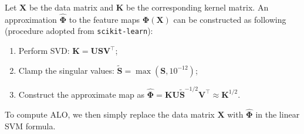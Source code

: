 \documentclass[11pt]{article}
\newcommand{\bK}{\bm{K}}
\newcommand{\bX}{\bm{X}}
\newcommand{\bPhi}{\bm{\Phi}}
\begin{document}
Let \(\bX\) be the data matrix and \(\bK\) be the corresponding kernel matrix. An approximation \(\hat{\bPhi}\) to the feature maps \(\bPhi(\bX)\) can be constructed as following (procedure adopted from \verb|scikit-learn|):
	\begin{enumerate}
		\item Perform SVD: \(\bK=\bm{U}\bm{S}\bm{V}^\top\);
		\item Clamp the singular values: \(\tilde{\bm{S}}=\max(\bm{S}, 10^{-12})\);
		\item Construct the approximate map as \(\hat{\bPhi}=\bK\bm{U}\tilde{\bm{S}}^{-1/2}\bm{V}^\top\approx\bK^{1/2}\).
	\end{enumerate}
To compute ALO, we then simply replace the data matrix \(\bX\) with \(\hat{\bPhi}\) in the linear SVM formula.
\end{document}
